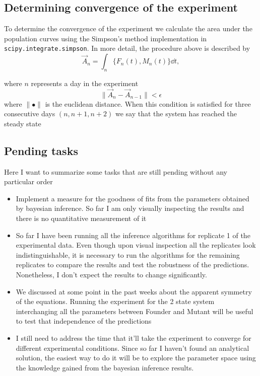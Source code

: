 \documentclass{article}
\begin{document}
\subsection{Determining convergence of the experiment}
To determine the convergence of the experiment we calculate the area under the population curves using the Simpson's method implementation in \verb|scipy.integrate.simpson|. In more detail, the procedure above is described by
\begin{equation}
	\vec{A}_n = \int_n \{F_n(t),M_n(t)\} \dd t,
\end{equation}

where $n$ represents a day in the experiment
\begin{equation}
	\|\vec{A}_n - \vec{A}_{n-1} \| < \epsilon
\end{equation}
where $\|\bullet\|$ is the euclidean distance. When this condition is satisfied for three consecutive days $(n, n+1, n+2)$ we say that the system has reached the steady state

\subsection{Pending tasks}
Here I want to summarize some tasks that are still pending without any particular order
\begin{itemize}
    \item Implement a measure for the goodness of fits from the parameters obtained by bayesian inference. So far I am only visually inspecting the results and there is no quantitative measurement of it
    \item So far I have been running all the inference algorithms for replicate 1 of the experimental data. Even though upon visual inspection all the replicates look indistinguishable, it is necessary to run the algorithms for the remaining replicates to compare the results and test the robustness of the predictions. Nonetheless, I don't expect the results to change significantly.
    \item We discussed at some point in the past weeks about the apparent symmetry of the equations. Running the experiment for the 2 state system interchanging all the parameters between Founder and Mutant will be useful to test that independence of the predictions
    \item I still need to address the time that it'll take the experiment to converge for different experimental conditions. Since so far I haven't found an analytical solution, the easiest way to do it will be to explore the parameter space using the knowledge gained from the bayesian inference results.
\end{itemize}

\ \newpage


\end{document}
